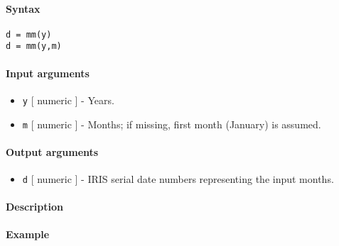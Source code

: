 


	\paragraph{Syntax}\label{syntax}

\begin{verbatim}
d = mm(y)
d = mm(y,m)
\end{verbatim}

\paragraph{Input arguments}\label{input-arguments}

\begin{itemize}
\item
  \texttt{y} {[} numeric {]} - Years.
\item
  \texttt{m} {[} numeric {]} - Months; if missing, first month (January)
  is assumed.
\end{itemize}

\paragraph{Output arguments}\label{output-arguments}

\begin{itemize}
\itemsep1pt\parskip0pt
\item
  \texttt{d} {[} numeric {]} - IRIS serial date numbers representing the
  input months.
\end{itemize}

\paragraph{Description}\label{description}

\paragraph{Example}\label{example}


